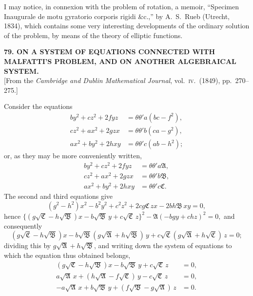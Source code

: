 \documentclass[11pt]{article}
\begin{document}
I may notice, in connexion with the problem of rotation, a memoir, ``Specimen Inaugurale de motu gyratorio corporis rigidi \&c.,'' by A.~S.~Rueb (Utrecht, 1834), which contains some very interesting developments of the ordinary solution of the problem, by means of the theory of elliptic functions.

\bigskip
\begin{center}
\textbf{79. ON A SYSTEM OF EQUATIONS CONNECTED WITH MALFATTI'S PROBLEM, AND ON ANOTHER ALGEBRAICAL SYSTEM.}\\[2pt]
[From the \textit{Cambridge and Dublin Mathematical Journal}, vol.~\textsc{iv}.\ (1849), pp.~270--275.]
\end{center}

Consider the equations
\[
\begin{aligned}
by^2 + cz^2 + 2fyz &= \theta\theta'a(bc - f^2),\\
cz^2 + ax^2 + 2gzx &= \theta\theta'b(ca - g^2),\\
ax^2 + by^2 + 2hxy &= \theta\theta'c(ab - h^2);
\end{aligned}
\]
or, as they may be more conveniently written,
\[
\begin{aligned}
by^2 + cz^2 + 2fyz &= \theta\theta'a\mathfrak{A},\\
cz^2 + ax^2 + 2gzx &= \theta\theta'b\mathfrak{B},\\
ax^2 + by^2 + 2hxy &= \theta\theta'c\mathfrak{C}.
\end{aligned}
\]
The second and third equations give
\[ (g^2 - h^2)x^2 - b^2 y^2 + c^2 z^2 + 2cg\mathfrak{C}\,zx - 2bh\mathfrak{B}\,xy = 0, \]
hence $\{(g\sqrt{\mathfrak{C}} - h\sqrt{\mathfrak{B}})x - b\sqrt{\mathfrak{B}}\,y + c\sqrt{\mathfrak{C}}\,z\}^2 - \mathfrak{A}(-bgy + chz)^2 = 0,$ and consequently
\[ (g\sqrt{\mathfrak{C}} - h\sqrt{\mathfrak{B}})x - b\sqrt{\mathfrak{B}}(g\sqrt{\mathfrak{A}} + h\sqrt{\mathfrak{B}})\,y + c\sqrt{\mathfrak{C}}(g\sqrt{\mathfrak{A}} + h\sqrt{\mathfrak{C}})\,z = 0; \]
dividing this by $g\sqrt{\mathfrak{A}} + h\sqrt{\mathfrak{B}}$, and writing down the system of equations to which the equation thus obtained belongs,
\[
\begin{aligned}
(g\sqrt{\mathfrak{C}} - h\sqrt{\mathfrak{B}})x - b\sqrt{\mathfrak{B}}\,y + c\sqrt{\mathfrak{C}}\,z &= 0,\\
a\sqrt{\mathfrak{A}}\,x + (h\sqrt{\mathfrak{A}} - f\sqrt{\mathfrak{C}})\,y - c\sqrt{\mathfrak{C}}\,z &= 0,\\
-a\sqrt{\mathfrak{A}}\,x + b\sqrt{\mathfrak{B}}\,y + (f\sqrt{\mathfrak{B}} - g\sqrt{\mathfrak{A}})\,z &= 0.
\end{aligned}
\]
\end{document}

